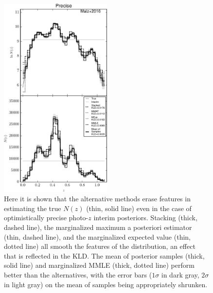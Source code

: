 \documentclass[preprint]{aastex}
\begin{document}
\begin{figure}
\includegraphics[width=0.5\textwidth]{figs/sig1/comps.pdf}
\caption{Here it is shown that the alternative methods erase features in 
estimating the true $N(z)$ (thin, solid line) even in the case of 
optimistically precise photo-$z$ interim posteriors.  Stacking (thick, dashed 
line), the marginalized maximum a posteriori estimator (thin, dashed line), and 
the marginalized expected value (thin, dotted line) all smooth the features of 
the distribution, an effect that is reflected in the KLD.  The mean of 
posterior samples (thick, solid line) and marginalized MMLE (thick, dotted 
line) perform better than the alternatives, with the error bars ($1\sigma$ in 
dark gray, $2\sigma$ in light gray) on the mean of samples being appropriately 
shrunken.}
\label{fig:sig1-comp}
\end{figure}
\end{document}
